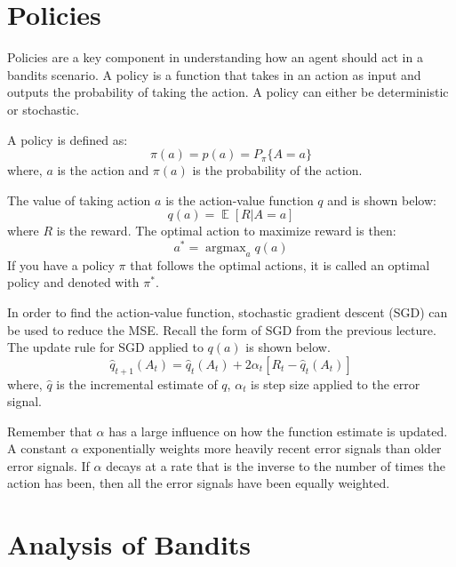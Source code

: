 \documentclass[twoside]{article}
\DeclareMathOperator{\E}{\mathbb{E}}
\DeclareMathOperator*{\argmax}{argmax} %
\begin{document}
\section{Policies}
Policies are a key component in understanding how an agent should act in a bandits scenario. A policy is a function that takes in an action as input and outputs the probability of taking the action. A policy can either be deterministic or stochastic.


A policy is defined as:
    \begin{equation}
        \pi(a) = p(a) = P_\pi\{A = a\}
    \end{equation}
where, $a$ is the action and $\pi(a)$ is the probability of the action.

The value of taking action $a$ is the action-value function $q$ and is shown below:
\begin{equation}
    q(a) = \E[R|A=a]
\end{equation}
where $R$ is the reward. The optimal action to maximize reward is then:
\begin{equation}
    a^* = \argmax_a q(a)
\end{equation}
If you have a policy $\pi$ that follows the optimal actions, it is called an optimal policy and denoted with $\pi^*$. 

In order to find the action-value function, stochastic gradient descent (SGD) can be used to reduce the MSE. Recall the form of SGD from the previous lecture. The update rule for SGD applied to $q(a)$ is shown below.
\begin{equation*}
    \hat{q}_{t+1}(A_t) = \hat{q}_t(A_t) + 2\alpha_t[R_t-\hat{q}_t(A_t)]
\end{equation*}
where, $\hat{q}$ is the incremental estimate of $q$,
$\alpha_t$ is step size applied to the error signal.

Remember that $\alpha$ has a large influence on how the function estimate is updated. A constant $\alpha$ exponentially weights more heavily recent error signals than older error signals. If $\alpha$ decays at a rate that is the inverse to the number of times the action has been, then all the error signals have been equally weighted.

\section{Analysis of Bandits}
\end{document}
